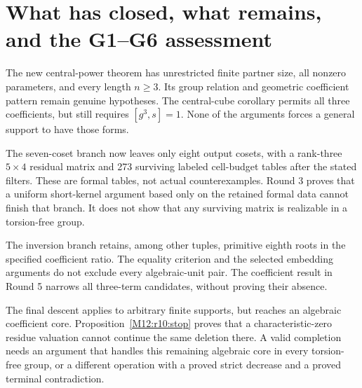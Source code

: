 \documentclass[11pt,a4paper,oneside]{report}
\theoremstyle{definition}
\theoremstyle{remark}
\begin{document}
\section{What has closed, what remains, and the G1--G6 assessment}
\label{M12:status:section}

The new central-power theorem has unrestricted finite partner size,
all nonzero parameters, and every length $n\ge3$. Its group relation
and geometric coefficient pattern remain genuine hypotheses.
The central-cube corollary permits all three coefficients, but still
requires $[g^3,s]=1$. None of the arguments forces a general support
to have those forms.

The seven-coset branch now leaves only eight output cosets, with a
rank-three $5\times4$ residual matrix and 273 surviving labeled
cell-budget tables after the stated filters. These are formal
tables, not actual counterexamples. Round 3 proves that a uniform
short-kernel argument based only on the retained formal data cannot
finish that branch. It does not show that any surviving matrix is
realizable in a torsion-free group.

The inversion branch retains, among other tuples, primitive eighth
roots in the specified coefficient ratio. The equality criterion
and the selected embedding arguments do not exclude every
algebraic-unit pair. The coefficient result in Round 5 narrows all
three-term candidates, without proving their absence.

The final descent applies to arbitrary finite supports, but reaches
an algebraic coefficient core. Proposition~\ref{M12:r10:stop} proves
that a characteristic-zero residue valuation cannot continue the
same deletion there. A valid completion needs an argument that
handles this remaining algebraic core in every torsion-free group,
or a different operation with a proved strict decrease and a proved
terminal contradiction.
\end{document}
